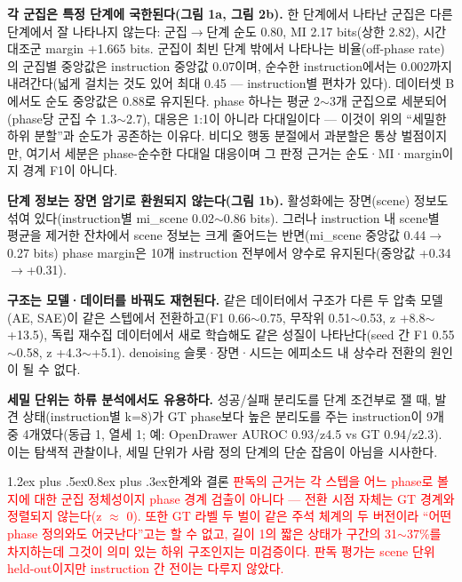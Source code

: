 \documentclass[a4paper,twocolumn,9pt]{extarticle}
\makeatletter
\newcommand{\new}[1]{\textcolor{red}{#1}}
\renewcommand\section{\@startsection{section}{1}{\z@}%
  {1.2ex plus .5ex}{0.8ex plus .3ex}{\centering\normalsize\bfseries}}
\makeatother
\begin{document}
\textbf{각 군집은 특정 단계에 국한된다(그림 1a, 그림 2b).} 한 단계에서 나타난 군집은
다른 단계에서 잘 나타나지 않는다: 군집$\rightarrow$단계 순도 0.80, MI 2.17 bits(상한
2.82), 시간 대조군 margin +1.665 bits. 군집이 최빈 단계 밖에서 나타나는
비율(off-phase rate)의 군집별 중앙값은 instruction 중앙값 0.07이며, 순수한 instruction에서는
0.002까지 내려간다(넓게 걸치는 것도 있어 최대 0.45 --- instruction별 편차가 있다).
데이터셋 B에서도 순도 중앙값은 0.88로 유지된다. phase 하나는 평균 2$\sim$3개 군집으로
세분되어(phase당 군집 수 1.3$\sim$2.7),
대응은 1:1이 아니라 다대일이다 --- 이것이 위의 ``세밀한 하위 분할''과 순도가
공존하는 이유다. 비디오 행동 분절에서 과분할은 통상 벌점이지만, 여기서 세분은
phase-순수한 다대일 대응이며 그 판정 근거는 순도·MI·margin이지 경계 F1이 아니다.

\textbf{단계 정보는 장면 암기로 환원되지 않는다(그림 1b).} 활성화에는 장면(scene)
정보도 섞여 있다(instruction별 mi\_scene 0.02$\sim$0.86 bits). 그러나 instruction 내
scene별 평균을 제거한 잔차에서 scene 정보는 크게 줄어드는 반면(mi\_scene 중앙값
0.44$\rightarrow$0.27 bits) phase margin은 10개 instruction 전부에서 양수로
유지된다(중앙값 +0.34$\rightarrow$+0.31).

\textbf{구조는 모델·데이터를 바꿔도 재현된다.} 같은 데이터에서 구조가 다른 두 압축
모델(AE, SAE)이 같은 스텝에서 전환하고(F1 0.66$\sim$0.75, 무작위 0.51$\sim$0.53, z
+8.8$\sim$+13.5), 독립 재수집 데이터에서 새로 학습해도 같은 성질이 나타난다(seed 간 F1
0.55$\sim$0.58, z +4.3$\sim$+5.1). denoising 슬롯·장면·시드는 에피소드 내 상수라 전환의
원인이 될 수 없다.

\textbf{세밀 단위는 하류 분석에서도 유용하다.} 성공/실패 분리도를 단계 조건부로 잴
때, 발견 상태(instruction별 k=8)가 GT phase보다 높은 분리도를 주는 instruction이 9개 중
4개였다(동급 1, 열세 1; 예: OpenDrawer AUROC 0.93/z4.5 vs GT 0.94/z2.3). 이는 탐색적
관찰이나, 세밀 단위가 사람 정의 단계의 단순 잡음이 아님을 시사한다.




\section{한계와 결론}
\new{판독의 근거는 각 스텝을 어느 phase로 볼지에 대한 군집 정체성이지 phase 경계 검출이
아니다 --- 전환 시점 자체는 GT 경계와 정렬되지 않는다(z $\approx$ 0). 또한 GT 라벨 두 벌이
같은 주석 체계의 두 버전이라 ``어떤 phase 정의와도 어긋난다''고는 할 수 없고, 길이 1의 짧은
상태가 구간의 31$\sim$37\%를 차지하는데 그것이 의미 있는 하위 구조인지는 미검증이다.
판독 평가는 scene 단위 held-out이지만 instruction 간 전이는 다루지 않았다.}
\end{document}
